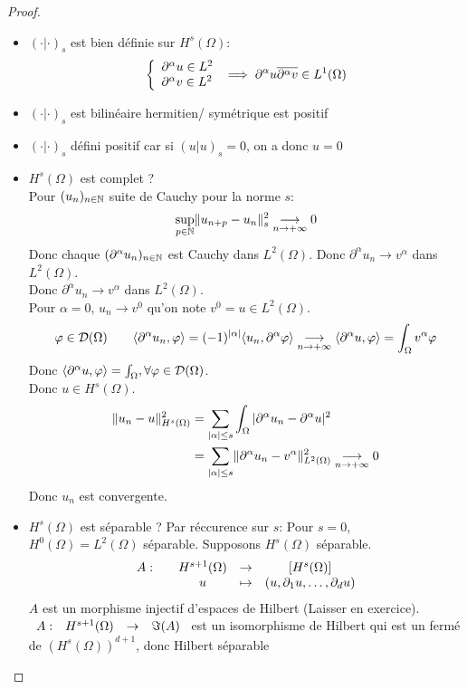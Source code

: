 \documentclass[]{report}
\begin{document}
    \begin{proof}
        \begin{itemize}
            \item $(\cdot|\cdot)_s$ est bien définie sur $H^s(\Omega)$:
            \[\left\{\begin{array}{ll} \partial^\alpha u\in L^2\\ \partial^\alpha v\in L^2 \end{array} \right.\implies \partial^{\alpha}u\overline{\partial^\alpha v}\in L^1(\Omega)\]
            \item $(\cdot|\cdot)_s$ est bilinéaire hermitien/ symétrique est positif
            \item $(\cdot|\cdot)_s$ défini positif car si $(u|u)_s=0$, on a donc $u=0$
            \item $H^s(\Omega)$ est complet ?\\
            Pour $(u_n)_{n\in\mathbb{N}}$ suite de Cauchy pour la norme $s$:
            \[\sup_{p\in \mathbb{N}}\lVert u_{n+p}-u_n \rVert_s^2\underset{n\to +\infty}{\longrightarrow} 0\]
            Donc chaque $(\partial^\alpha u_n)_{n\in\mathbb{N}}$ est Cauchy dans $L^2(\Omega)$. Donc $\partial^\alpha u_n\to v^\alpha$ dans $L^2(\Omega)$.\\
            Donc $\partial^\alpha u_n\to v^\alpha$ dans $L^2(\Omega)$.\\
            Pour $\alpha=0$, $u_n\to v^0$ qu'on note $v^0=u\in L^2(\Omega)$.
            \[\varphi\in \mathcal{D}(\Omega)\qquad \langle \partial^\alpha u_n,\varphi \rangle=(-1)^{|\alpha|}\langle u_n,\partial^\alpha \varphi \rangle\underset{n\to +\infty}{\longrightarrow} \langle \partial^\alpha u,\varphi \rangle=\int_{\Omega}v^\alpha \varphi\]
            Donc $\langle \partial^\alpha u,\varphi \rangle=\int_\Omega,\forall \varphi\in \mathcal{D}(\Omega)$.\\
            Donc $u\in H^s(\Omega)$.
            \begin{align*}
                \lVert u_n-u \rVert_{H^s(\Omega)}^2&=\sum_{|\alpha|\le s}\int_\Omega |\partial^\alpha u_n-\partial^\alpha u|^2\\
                &=\sum_{|\alpha|\le s}\lVert \partial^\alpha u_n-v^\alpha \rVert_{L^2(\Omega)}^2\underset{n\to +\infty}{\longrightarrow}0
            \end{align*}
            Donc $u_n$ est convergente.
            \item $H^s(\Omega)$ est séparable ? Par réccurence sur $s$:
            Pour $s=0$, $H^0(\Omega)=L^2(\Omega)$ séparable. Supposons $H^s(\Omega)$ séparable.
            \[\begin{array}{ccccc} A : & & H^{s+1}(\Omega) & \to & \left[H^s(\Omega)\right] \\ & & u & \mapsto & (u,\partial_1 u,\ldots,\partial_d u) \end{array}\]
            $A$ est un morphisme injectif d'espaces de Hilbert (Laisser en exercice).\\
            $\begin{array}{ccccc} A : & H^{s+1}(\Omega) & \to & \Im(A) \end{array}$ est un isomorphisme de Hilbert qui est un fermé de $(H^s(\Omega))^{d+1}$, donc Hilbert séparable     
        \end{itemize}
    \end{proof}
\end{document}
